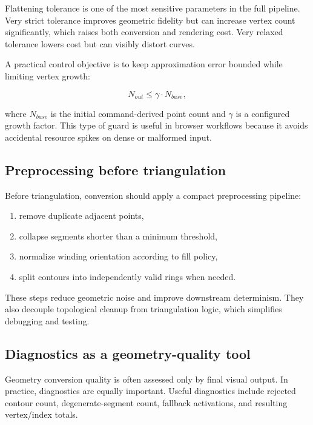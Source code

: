 Flattening tolerance is one of the most sensitive parameters in the full pipeline.
Very strict tolerance improves geometric fidelity but can increase vertex count significantly, which raises both conversion and rendering cost.
Very relaxed tolerance lowers cost but can visibly distort curves.

A practical control objective is to keep approximation error bounded while limiting vertex growth:

\begin{equation}
N_{out} \leq \gamma \cdot N_{base},
\label{eq:vertex_growth_bound}
\end{equation}

where $N_{base}$ is the initial command-derived point count and $\gamma$ is a configured growth factor.
This type of guard is useful in browser workflows because it avoids accidental resource spikes on dense or malformed input.

\subsection{Preprocessing before triangulation}

Before triangulation, conversion should apply a compact preprocessing pipeline:

\begin{enumerate}
\item remove duplicate adjacent points,
\item collapse segments shorter than a minimum threshold,
\item normalize winding orientation according to fill policy,
\item split contours into independently valid rings when needed.
\end{enumerate}

These steps reduce geometric noise and improve downstream determinism.
They also decouple topological cleanup from triangulation logic, which simplifies debugging and testing.

\subsection{Diagnostics as a geometry-quality tool}

Geometry conversion quality is often assessed only by final visual output.
In practice, diagnostics are equally important.
Useful diagnostics include rejected contour count, degenerate-segment count, fallback activations, and resulting vertex/index totals.

